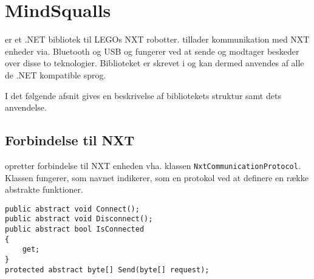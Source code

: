 \section{MindSqualls}
\mindsqualls er et .NET bibliotek til LEGOs NXT robotter.
\mindsqualls tillader kommunikation med NXT enheder via. Bluetooth og USB og fungerer ved at sende og modtager beskeder over disse to teknologier.
Biblioteket er skrevet i \csharp og kan dermed anvendes af alle de .NET kompatible sprog.

I det følgende afsnit gives en beskrivelse af bibliotekets struktur samt dets anvendelse.

\subsection{Forbindelse til NXT}
\mindsqualls opretter forbindelse til NXT enheden vha. klassen \lstinline[style=csharp]!NxtCommunicationProtocol!.
Klassen fungerer, som navnet indikerer, som en protokol ved at definere en række abstrakte funktioner.
\begin{lstlisting}[style=csharp]
public abstract void Connect();
public abstract void Disconnect();
public abstract bool IsConnected
{
    get;
}
protected abstract byte[] Send(byte[] request);
\end{lstlisting}